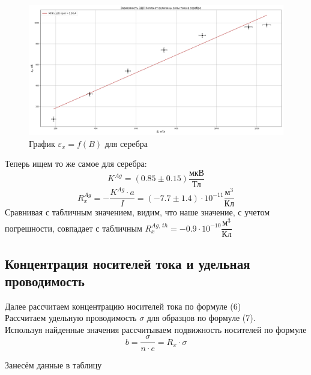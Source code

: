 \documentclass[a4paper,12pt]{article}
\theoremstyle{definition}
\begin{document}
    \begin{figure}[h]
      \centering
        \includegraphics[scale=0.38]{graph-hall-arg.png}
      \caption{График $\varepsilon_x = f(B)$ для серебра}
    \end{figure}

    Теперь ищем то же самое для серебра: 
    $$K^{Ag}  = (0.85 \pm 0.15) \dfrac{\text{мкВ}}{\text{Тл}}$$
    $$R_x^{Ag} = - \dfrac{K^{Ag} \cdot a}{I} = (-7.7 \pm 1.4) \cdot 10^{-11} \dfrac{\text{м}^3}{\text{Кл}}$$
    Сравнивая с табличным значением, видим, что наше значение, с учетом погрешности, совпадает с табличным $R_x^{Ag,\,th} = -0.9 \cdot 10^{-10} \dfrac{\text{м}^3}{\text{Кл}}$\\


    \subsection{Концентрация носителей тока и удельная проводимость}
    
    Далее рассчитаем концентрацию носителей тока по формуле (6)\\
    
    Рассчитаем удельную проводимость $\sigma$ для образцов по формуле (7).\\
   
    Используя найденные значения рассчитываем подвижность носителей по формуле 
    \[b = \dfrac{\sigma}{n \cdot e} = R_x \cdot \sigma\]

    Занесём данные в таблицу 
\end{document}
